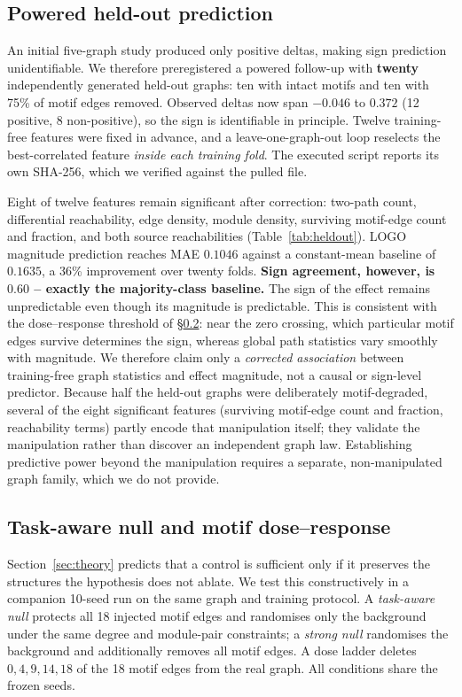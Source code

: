 \documentclass[10pt,twocolumn,letterpaper]{article}
\begin{document}
\subsection{Powered held-out prediction}
\label{sec:heldout}

An initial five-graph study produced only positive deltas, making sign
prediction unidentifiable. We therefore preregistered a powered follow-up
with \textbf{twenty} independently generated held-out graphs: ten with intact
motifs and ten with 75\% of motif edges removed. Observed deltas now span
$-0.046$ to $0.372$ (12 positive, 8 non-positive), so the sign is
identifiable in principle. Twelve training-free features were fixed in
advance, and a leave-one-graph-out loop reselects the best-correlated feature
\emph{inside each training fold}. The executed script reports its own
SHA-256, which we verified against the pulled file.

Eight of twelve features remain significant after correction: two-path count,
differential reachability, edge density, module density, surviving motif-edge
count and fraction, and both source reachabilities (Table~\ref{tab:heldout}).
LOGO magnitude prediction reaches MAE $0.1046$ against a constant-mean
baseline of $0.1635$, a 36\% improvement over twenty folds. \textbf{Sign
agreement, however, is $0.60$ -- exactly the majority-class baseline.} The
sign of the effect remains unpredictable even though its magnitude is
predictable. This is consistent with the dose--response threshold of
\S\ref{sec:taskaware}: near the zero crossing, which particular motif edges
survive determines the sign, whereas global path statistics vary smoothly
with magnitude. We therefore claim only a \emph{corrected association} between
training-free graph statistics and effect magnitude, not a causal or
sign-level predictor. Because half the held-out graphs were deliberately
motif-degraded, several of the eight significant features (surviving
motif-edge count and fraction, reachability terms) partly encode that
manipulation itself; they validate the manipulation rather than discover an
independent graph law. Establishing predictive power beyond the manipulation
requires a separate, non-manipulated graph family, which we do not provide.

\subsection{Task-aware null and motif dose--response}
\label{sec:taskaware}

Section~\ref{sec:theory} predicts that a control is sufficient only if it
preserves the structures the hypothesis does not ablate. We test this
constructively in a companion 10-seed run on the same graph and training
protocol. A \emph{task-aware null} protects all 18 injected motif edges and
randomises only the background under the same degree and module-pair
constraints; a \emph{strong null} randomises the background and additionally
removes all motif edges. A dose ladder deletes $0,4,9,14,18$ of the 18 motif
edges from the real graph. All conditions share the frozen seeds.
\end{document}
